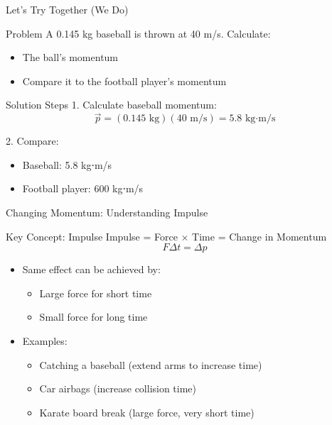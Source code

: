 \documentclass{beamer}
\begin{document}
\begin{frame}{Let's Try Together (We Do)}
\begin{block}{Problem}
A 0.145 kg baseball is thrown at 40 m/s. Calculate:
\begin{itemize}
\item The ball's momentum
\item Compare it to the football player's momentum
\end{itemize}
\end{block}

\pause

\begin{block}{Solution Steps}
1. Calculate baseball momentum:
   $$\vec{p} = (0.145\text{ kg})(40\text{ m/s}) = 5.8\text{ kg⋅m/s}$$
   
2. Compare:
   \begin{itemize}
   \item Baseball: 5.8 kg⋅m/s
   \item Football player: 600 kg⋅m/s
   \end{itemize}
\end{block}
\end{frame}

\begin{frame}{Changing Momentum: Understanding Impulse}
\begin{block}{Key Concept: Impulse}
Impulse = Force × Time = Change in Momentum
$$F\Delta t = \Delta p$$
\end{block}

\begin{itemize}
\item Same effect can be achieved by:
    \begin{itemize}
    \item Large force for short time
    \item Small force for long time
    \end{itemize}
\item Examples:
    \begin{itemize}
    \item Catching a baseball (extend arms to increase time)
    \item Car airbags (increase collision time)
    \item Karate board break (large force, very short time)
    \end{itemize}
\end{itemize}
\end{frame}
\end{document}
